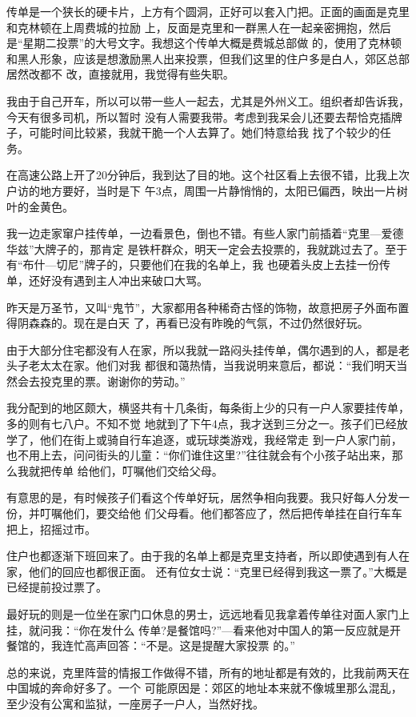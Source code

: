 ﻿\documentclass[11pt]{article}
\begin{document}
传单是一个狭长的硬卡片，上方有个圆洞，正好可以套入门把。正面的画面是克里和克林顿在上周费城的拉励
上，反面是克里和一群黑人在一起亲密拥抱，然后是``星期二投票''的大号文字。我想这个传单大概是费城总部做
的，使用了克林顿和黑人形象，应该是想激励黑人出来投票，但我们这里的住户多是白人，郊区总部居然改都不
改，直接就用，我觉得有些失职。

我由于自己开车，所以可以带一些人一起去，尤其是外州义工。组织者却告诉我，今天有很多司机，所以暂时
没有人需要我带。考虑到我呆会儿还要去帮恰克插牌子，可能时间比较紧，我就干脆一个人去算了。她们特意给我
找了个较少的任务。

在高速公路上开了20分钟后，我到达了目的地。这个社区看上去很不错，比我上次户访的地方要好，当时是下
午3点，周围一片静悄悄的，太阳已偏西，映出一片树叶的金黄色。

我一边走家窜户挂传单，一边看景色，倒也不错。有些人家门前插着``克里---爱德华兹''大牌子的，那肯定
是铁杆群众，明天一定会去投票的，我就跳过去了。至于有``布什---切尼''牌子的，只要他们在我的名单上，我
也硬着头皮上去挂一份传单，还好没有遇到主人冲出来破口大骂。

昨天是万圣节，又叫``鬼节''，大家都用各种稀奇古怪的饰物，故意把房子外面布置得阴森森的。现在是白天
了，再看已没有昨晚的气氛，不过仍然很好玩。

由于大部分住宅都没有人在家，所以我就一路闷头挂传单，偶尔遇到的人，都是老头子老太太在家。他们对我
都很和蔼热情，当我说明来意后，都说：``我们明天当然会去投克里的票。谢谢你的劳动。''

我分配到的地区颇大，横竖共有十几条街，每条街上少的只有一户人家要挂传单，多的则有七八户。不知不觉
地就到了下午4点，我才送到三分之一。孩子们已经放学了，他们在街上或骑自行车追逐，或玩球类游戏，我经常走
到一户人家门前，也不用上去，问问街头的儿童：``你们谁住这里?''往往就会有个小孩子站出来，那么我就把传单
给他们，叮嘱他们交给父母。

有意思的是，有时候孩子们看这个传单好玩，居然争相向我要。我只好每人分发一份，并叮嘱他们，要交给他
们父母看。他们都答应了，然后把传单挂在自行车车把上，招摇过市。


住户也都逐渐下班回来了。由于我的名单上都是克里支持者，所以即使遇到有人在家，他们的回应也都很正面。
还有位女士说：``克里已经得到我这一票了。''大概是已经提前投过票了。

最好玩的则是一位坐在家门口休息的男士，远远地看见我拿着传单往对面人家门上挂，就问我：``你在发什么
传单?是餐馆吗?''---看来他对中国人的第一反应就是开餐馆的，我连忙高声回答：``不是。这是提醒大家投票
的。''

总的来说，克里阵营的情报工作做得不错，所有的地址都是有效的，比我前两天在中国城的奔命好多了。一个
可能原因是：郊区的地址本来就不像城里那么混乱，至少没有公寓和监狱，一座房子一户人，当然好找。
\end{document}

